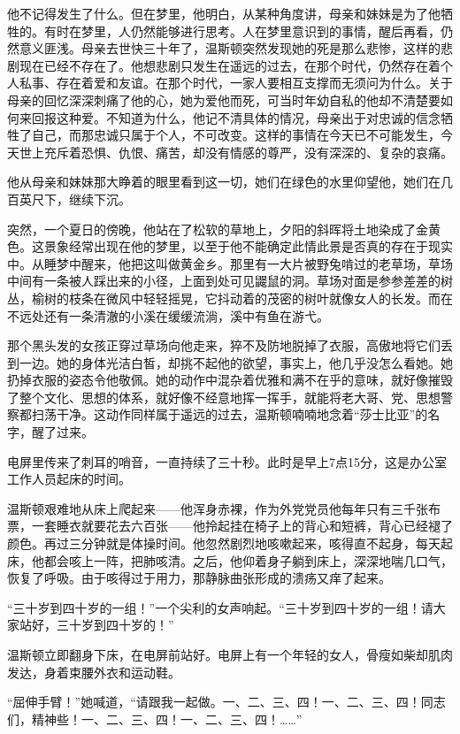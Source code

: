 他不记得发生了什么。但在梦里，他明白，从某种角度讲，母亲和妹妹是为了他牺牲的。有时在梦里，人仍然能够进行思考。人在梦里意识到的事情，醒后再看，仍然意义匪浅。母亲去世快三十年了，温斯顿突然发现她的死是那么悲惨，这样的悲剧现在已经不存在了。他想悲剧只发生在遥远的过去，在那个时代，仍然存在着个人私事、存在着爱和友谊。在那个时代，一家人要相互支撑而无须问为什么。关于母亲的回忆深深刺痛了他的心，她为爱他而死，可当时年幼自私的他却不清楚要如何来回报这种爱。不知道为什么，他记不清具体的情况，母亲出于对忠诚的信念牺牲了自己，而那忠诚只属于个人，不可改变。这样的事情在今天已不可能发生，今天世上充斥着恐惧、仇恨、痛苦，却没有情感的尊严，没有深深的、复杂的哀痛。

他从母亲和妹妹那大睁着的眼里看到这一切，她们在绿色的水里仰望他，她们在几百英尺下，继续下沉。

突然，一个夏日的傍晚，他站在了松软的草地上，夕阳的斜晖将土地染成了金黄色。这景象经常出现在他的梦里，以至于他不能确定此情此景是否真的存在于现实中。从睡梦中醒来，他把这叫做黄金乡。那里有一大片被野兔啃过的老草场，草场中间有一条被人踩出来的小径，上面到处可见鼹鼠的洞。草场对面是参参差差的树丛，榆树的枝条在微风中轻轻摇晃，它抖动着的茂密的树叶就像女人的长发。而在不远处还有一条清澈的小溪在缓缓流淌，溪中有鱼在游弋。

那个黑头发的女孩正穿过草场向他走来，猝不及防地脱掉了衣服，高傲地将它们丢到一边。她的身体光洁白皙，却挑不起他的欲望，事实上，他几乎没怎么看她。她扔掉衣服的姿态令他敬佩。她的动作中混杂着优雅和满不在乎的意味，就好像摧毁了整个文化、思想的体系，就好像不经意地挥一挥手，就能将老大哥、党、思想警察都扫荡干净。这动作同样属于遥远的过去，温斯顿喃喃地念着``莎士比亚''的名字，醒了过来。

电屏里传来了刺耳的哨音，一直持续了三十秒。此时是早上7点15分，这是办公室工作人员起床的时间。

温斯顿艰难地从床上爬起来------他浑身赤裸，作为外党党员他每年只有三千张布票，一套睡衣就要花去六百张------他拎起挂在椅子上的背心和短裤，背心已经褪了颜色。再过三分钟就是体操时间。他忽然剧烈地咳嗽起来，咳得直不起身，每天起床，他都会咳上一阵，把肺咳清。之后，他仰着身子躺到床上，深深地喘几口气，恢复了呼吸。由于咳得过于用力，那静脉曲张形成的溃疡又痒了起来。

``三十岁到四十岁的一组！''一个尖利的女声响起。``三十岁到四十岁的一组！请大家站好，三十岁到四十岁的！''

温斯顿立即翻身下床，在电屏前站好。电屏上有一个年轻的女人，骨瘦如柴却肌肉发达，身着束腰外衣和运动鞋。

``屈伸手臂！''她喊道，``请跟我一起做。一、二、三、四！一、二、三、四！同志们，精神些！一、二、三、四！一、二、三、四！\ldots\ldots''

